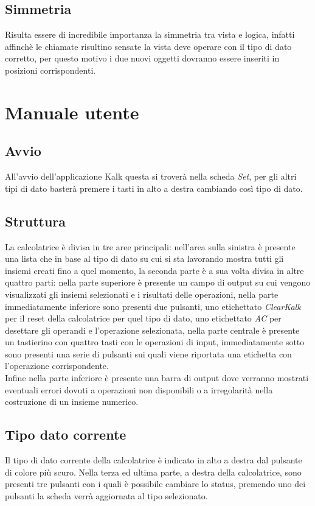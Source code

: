 \documentclass[a4paper,10pt]{article}
\begin{document}
        \subsection{Simmetria}
        Risulta essere di incredibile importanza la simmetria tra vista e logica, infatti affinchè le chiamate risultino sensate la vista deve operare con il tipo di dato corretto, per questo motivo i due nuovi oggetti dovranno essere inseriti in posizioni corrispondenti.
        
        \section{Manuale utente}
        \subsection{Avvio}
        All’avvio dell’applicazione Kalk questa si troverà nella scheda \textit{Set}, per gli altri tipi di dato basterà premere i tasti in alto a destra cambiando così tipo di dato.
        \subsection{Struttura}
        La calcolatrice è divisa in tre aree principali: nell’area sulla sinistra è presente una lista che in base al tipo di dato su cui si sta lavorando mostra tutti gli insiemi creati fino a quel momento, la seconda parte è a sua volta divisa in altre quattro parti: nella parte superiore è presente un campo di output su cui vengono visualizzati gli insiemi selezionati e i risultati delle operazioni, nella parte immediatamente inferiore sono presenti due pulsanti, uno etichettato \textit{ClearKalk} per il reset della calcolatrice per quel tipo di dato, uno etichettato \textit{AC} per desettare gli operandi e l'operazione selezionata, nella parte centrale è presente un tastierino con quattro tasti con le operazioni di input, immediatamente sotto sono presenti una serie di pulsanti sui quali viene riportata una etichetta con l’operazione corrispondente.\\
        Infine nella parte inferiore è presente una barra di output dove verranno mostrati eventuali errori dovuti a operazioni non disponibili o a irregolarità nella costruzione di un insieme numerico.
        \subsection{Tipo dato corrente}
        Il tipo di dato corrente della calcolatrice è indicato in alto a destra dal pulsante di colore più scuro.
        Nella terza ed ultima parte, a destra della calcolatrice, sono presenti tre pulsanti con i quali è possibile cambiare lo status, premendo uno dei pulsanti la scheda verrà aggiornata al tipo selezionato. 
\end{document}

